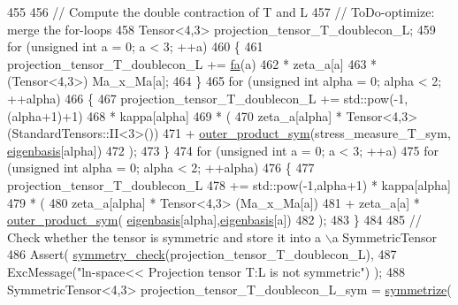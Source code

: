 \begin{DoxyCode}
455 
456     \textcolor{comment}{// Compute the double contraction of T and L}
457      \textcolor{comment}{// ToDo-optimize: merge the for-loops}
458      Tensor<4,3> projection\_tensor\_T\_doublecon\_L;
459      \textcolor{keywordflow}{for} (\textcolor{keywordtype}{unsigned} \textcolor{keywordtype}{int} a = 0; a < 3; ++a)
460      \{
461         projection\_tensor\_T\_doublecon\_L += \hyperlink{classln__space_aff1eab9675707d7aeed154aadb11adf4}{fa}(a)
462                                            * zeta\_a[a]
463                                            * (Tensor<4,3>) Ma\_x\_Ma[a];
464      \}
465      \textcolor{keywordflow}{for} (\textcolor{keywordtype}{unsigned} \textcolor{keywordtype}{int} alpha = 0; alpha < 2; ++alpha)
466      \{
467         projection\_tensor\_T\_doublecon\_L += std::pow(-1, (alpha+1)+1)
468                                            * kappa[alpha]
469                                            * (
470                                                zeta\_a[alpha] * Tensor<4,3> (StandardTensors::II<3>())
471                                                + \hyperlink{functions_8h_aa5f33021df9244e49e86b17b15286fa1}{outer\_product\_sym}(stress\_measure\_T\_sym,
      \hyperlink{classln__space_a1e67221edabbd2db69aa4a21262bd1f4}{eigenbasis}[alpha])
472                                              );
473      \}
474      \textcolor{keywordflow}{for} (\textcolor{keywordtype}{unsigned} \textcolor{keywordtype}{int} a = 0; a < 3; ++a)
475          \textcolor{keywordflow}{for} (\textcolor{keywordtype}{unsigned} \textcolor{keywordtype}{int} alpha = 0; alpha < 2; ++alpha)
476          \{
477              projection\_tensor\_T\_doublecon\_L
478                   += std::pow(-1,alpha+1) * kappa[alpha]
479                      * (
480                            zeta\_a[alpha] * Tensor<4,3> (Ma\_x\_Ma[a])
481                            + zeta\_a[a] * \hyperlink{functions_8h_aa5f33021df9244e49e86b17b15286fa1}{outer\_product\_sym}(
      \hyperlink{classln__space_a1e67221edabbd2db69aa4a21262bd1f4}{eigenbasis}[alpha],\hyperlink{classln__space_a1e67221edabbd2db69aa4a21262bd1f4}{eigenbasis}[a])
482                         );
483          \}
484 
485     \textcolor{comment}{// Check whether the tensor is symmetric and store it into a \(\backslash\)a SymmetricTensor}
486      Assert( \hyperlink{functions_8h_aa37f13547b984cb066e2fcb530b36425}{symmetry\_check}(projection\_tensor\_T\_doublecon\_L),
487                   ExcMessage(\textcolor{stringliteral}{"ln-space<< Projection tensor T:L is not symmetric"}) );
488      SymmetricTensor<4,3> projection\_tensor\_T\_doublecon\_L\_sym = \hyperlink{functions_8h_afe83e9509497294b7f662b800b6b91ff}{symmetrize}(

\end{DoxyCode}
